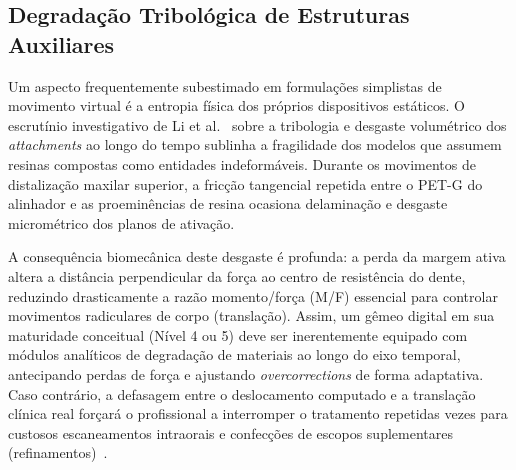 \subsection{Degradação Tribológica de Estruturas Auxiliares}

Um aspecto frequentemente subestimado em formulações simplistas de movimento virtual é a entropia física dos próprios dispositivos estáticos. O escrutínio investigativo de Li et al.~\cite{li2025impacts} sobre a tribologia e desgaste volumétrico dos \textit{attachments} ao longo do tempo sublinha a fragilidade dos modelos que assumem resinas compostas como entidades indeformáveis. Durante os movimentos de distalização maxilar superior, a fricção tangencial repetida entre o PET-G do alinhador e as proeminências de resina ocasiona delaminação e desgaste micrométrico dos planos de ativação.

A consequência biomecânica deste desgaste é profunda: a perda da margem ativa altera a distância perpendicular da força ao centro de resistência do dente, reduzindo drasticamente a razão momento/força (M/F) essencial para controlar movimentos radiculares de corpo (translação). Assim, um gêmeo digital em sua maturidade conceitual (Nível 4 ou 5) deve ser inerentemente equipado com módulos analíticos de degradação de materiais ao longo do eixo temporal, antecipando perdas de força e ajustando \textit{overcorrections} de forma adaptativa. Caso contrário, a defasagem entre o deslocamento computado e a translação clínica real forçará o profissional a interromper o tratamento repetidas vezes para custosos escaneamentos intraorais e confecções de escopos suplementares (refinamentos)~\cite{zhang2024recursive}.
